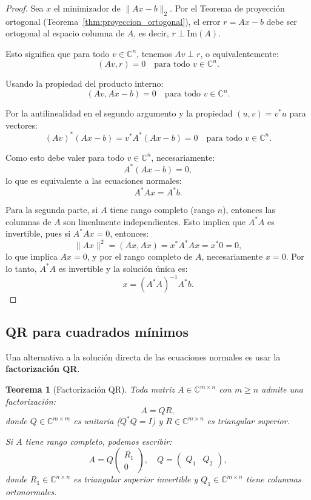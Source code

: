 \documentclass[a4paper,11pt]{report}
\newtheorem{theorem}{Teorema}[chapter]
\begin{document}
\begin{proof}
Sea $x$ el minimizador de $\|Ax - b\|_2$. Por el Teorema de proyección ortogonal (Teorema~\ref{thm:proyeccion_ortogonal}), el error $r = Ax - b$ debe ser ortogonal al espacio columna de $A$, es decir, $r \perp \text{Im}(A)$.

Esto significa que para todo $v \in \mathbb{C}^n$, tenemos $Av \perp r$, o equivalentemente:
\[
(Av, r) = 0 \quad \text{para todo } v \in \mathbb{C}^n.
\]

Usando la propiedad del producto interno:
\[
(Av, Ax - b) = 0 \quad \text{para todo } v \in \mathbb{C}^n.
\]

Por la antilinealidad en el segundo argumento y la propiedad $(u,v) = v^*u$ para vectores:
\[
(Av)^*(Ax - b) = v^*A^*(Ax - b) = 0 \quad \text{para todo } v \in \mathbb{C}^n.
\]

Como esto debe valer para todo $v \in \mathbb{C}^n$, necesariamente:
\[
A^*(Ax - b) = 0,
\]
lo que es equivalente a las ecuaciones normales:
\[
A^*Ax = A^*b.
\]

Para la segunda parte, si $A$ tiene rango completo (rango $n$), entonces las columnas de $A$ son linealmente independientes. Esto implica que $A^*A$ es invertible, pues si $A^*Ax = 0$, entonces:
\[
\|Ax\|^2 = (Ax, Ax) = x^*A^*Ax = x^*0 = 0,
\]
lo que implica $Ax = 0$, y por el rango completo de $A$, necesariamente $x = 0$. Por lo tanto, $A^*A$ es invertible y la solución única es:
\[
x = (A^*A)^{-1}A^*b.
\]
\end{proof}

\subsection{QR para cuadrados mínimos}

Una alternativa a la solución directa de las ecuaciones normales es usar la \textbf{factorización QR}.

\begin{theorem}[Factorización QR]
Toda matriz $A \in \mathbb{C}^{m \times n}$ con $m \geq n$ admite una factorización:
\[
A = QR,
\]
donde $Q \in \mathbb{C}^{m \times m}$ es unitaria ($Q^*Q = I$) y $R \in \mathbb{C}^{m \times n}$ es triangular superior.

Si $A$ tiene rango completo, podemos escribir:
\[
A = Q \begin{pmatrix} R_1 \\ 0 \end{pmatrix}, \quad Q = \begin{pmatrix} Q_1 & Q_2 \end{pmatrix},
\]
donde $R_1 \in \mathbb{C}^{n \times n}$ es triangular superior invertible y $Q_1 \in \mathbb{C}^{m \times n}$ tiene columnas ortonormales.
\end{theorem}
\end{document}
